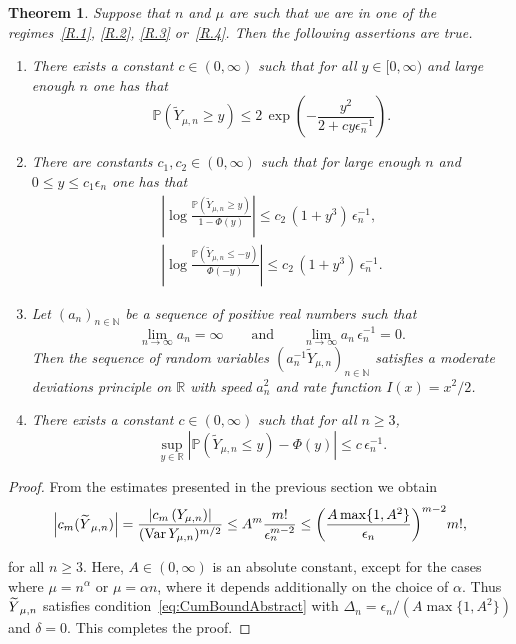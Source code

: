 \documentclass[10pt]{amsart}
\newtheorem{theo}{Theorem}[section]
\theoremstyle{definition}\newtheorem{defi}[theo]{Definition}\newtheorem{rema}[theo]{Remark}\newtheorem{exam}[theo]{Example}\newtheorem{exem}[theo]{Example}\newtheorem{nota}[theo]{Notation}
\newcommand{\R}{\mathbb{R}}
\newcommand{\N}{\mathbb{N}}
\newcommand{\PP}{\mathbb{P}}
\newcommand{\Var}{\mathop{\mathrm{Var}}\nolimits}
\newcommand*{\romanenumi}{\renewcommand*{\theenumi}{\roman{enumi}}}
\let\oldtilde\tilde
\renewcommand*{\tilde}[1]{\mathchoice{\widetilde{#1}}{\widetilde{#1}}{\oldtilde{#1}}{\oldtilde{#1}}}
\begin{document}
\begin{theo}\label{thm:Main}
Suppose that $n$ and $\mu$ are such that we are in one of the regimes~\eqref{R.1}, \eqref{R.2}, \eqref{R.3} or~\eqref{R.4}. Then the following assertions are true.
\begin{enumerate}\romanenumi
\item\label{list4.4.1} There exists a constant $c\in(0,\infty)$ such that for all $y\in[0,\infty)$ and large enough $n$ one has that
\[
\PP\left(\widetilde{Y}_{\mu,n}\geq y\right) \leq 2\,\exp\left(-\frac{y^2}{2+cy\epsilon_n^{-1}}\right).
\]

\item\label{list4.4.2} There are constants $c_1,c_2\in(0,\infty)$ such that for large enough $n$ and\linebreak$0\leq y\leq c_1\epsilon_n$ one has that
\begin{align*}
\left|\log\frac{\PP\left(\widetilde{Y}_{\mu,n}\geq y\right)}{1-\Phi(y)}\right| \leq c_2\,\left(1+y^3\right)\,\epsilon_n^{-1},\\
\left|\log\frac{\PP\left(\widetilde{Y}_{\mu,n}\leq -y\right)}{\Phi(-y)}\right| \leq c_2\,\left(1+y^3\right)\,\epsilon_n^{-1}.
\end{align*}

\item\label{list4.4.3} Let $(a_n)_{n\in\N}$ be a sequence of positive real numbers such that
\[
\lim_{n\to\infty}a_n=\infty\qquad\text{and}\qquad \lim_{n\to\infty}a_n\,\epsilon_n^{-1} = 0.
\]
Then the sequence of random variables $(a_n^{-1}\widetilde{Y}_{\mu,n})_{n\in\N}$ satisfies a moderate deviations principle on $\R$ with speed $a_n^2$ and rate function $I(x)=x^2/2$.

\item \label{list4.4.4}There exists a constant $c\in(0,\infty)$ such that for all $n\geq 3$,
\[
\sup_{y\in\R}\left|\PP\left(\widetilde{Y}_{\mu,n}\leq y\right)-\Phi(y)\right| \leq c\,\epsilon_n^{-1}.
\]
\end{enumerate}
\end{theo}

\begin{proof}
From the estimates presented in the previous section we obtain
\[
\left|c_m(\tilde Y_{\mu, n})\right|=\frac{\left|c_m\left(Y_{\mu, n}\right)\right|}{(\Var Y_{\mu, n})^{m/2}}\leq A^m\frac{m!}{\epsilon_n^{m-2}}\leq\bigg(\frac{A\max\{1,A^2\}}{\epsilon_n}\bigg)^{m-2}m!,
\]

for all $n\geq 3$. Here, $A\in(0,\infty)$ is an absolute constant, except for the cases where $\mu=n^\alpha$ or $\mu=\alpha n$, where it depends additionally on the choice of $\alpha$. Thus $\tilde Y_{\mu, n}$ satisfies condition~\eqref{eq:CumBoundAbstract} with $\Delta_n=\epsilon_n/(A\max\{1,A^2\})$ and $\delta=0$. This completes the proof.
\end{proof}
\end{document}
